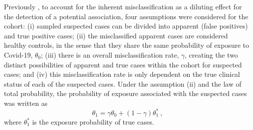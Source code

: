 Previously \citep{malato2021Statisticalchallenges}, to account for the inherent misclassification as a diluting effect for the detection of a potential association, four assumptions were considered for the \cfs cohort: (i) sampled suspected \cfs cases can be divided into apparent (false positives) and true positive cases; (ii) the misclassified apparent cases are considered healthy controls, in the sense that they share the same probability of exposure to Covid-19, $\theta_0$; (iii) there is an overall misclassification rate, $\gamma$, creating the two distinct possibilities of apparent and true cases within the cohort for suspected cases; and (iv) this misclassification rate is only dependent on the true clinical status of each of the suspected cases. Under the assumption (ii) and the law of total probability, the probability of exposure associated with the suspected cases was written as
% 
\begin{equation}
    \theta_1 = \gamma \theta_0 + (1 - \gamma) \theta_{1}^{*}\ ,
    \label{eq:theta_11}
\end{equation}
% 
where $\theta_{1}^{*}$ is the exposure probability of true \cfs cases.

